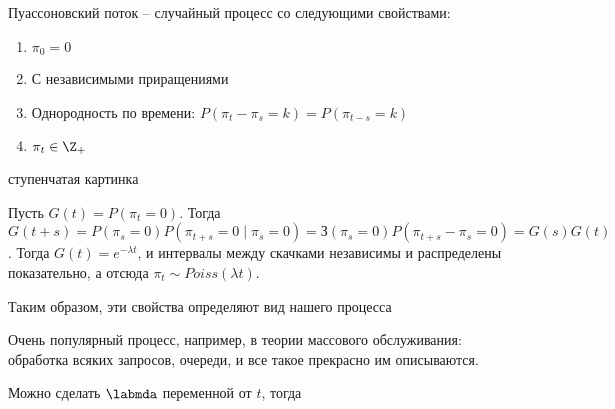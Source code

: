 \begin{Def}
Пуассоновский поток -- случайный процесс со следующими свойствами:
\begin{enumerate}
\item $\pi_0 = 0$
\item С независимыми приращениями
\item Однородность по времени: $P(\pi_t - \pi_s = k) = P(\pi_{t-s} = k)$
\item $\pi_t \in \Z_+$
\end{enumerate}
\end{Def}
\TODO ступенчатая картинка \TODO

Пусть $G(t) = P(\pi_t = 0)$. Тогда $G(t + s) = P(\pi_s = 0) P(\pi_{t + s} = 0 \mid \pi_s = 0) = З(\pi_s = 0) P(\pi_{t + s} - \pi_s = 0) = G(s) G(t)$.
Тогда $G(t) = e^{-\lambda t}$, и интервалы между скачками независимы и распределены показательно, а отсюда $\pi_t \sim Poiss(\lambda t)$.

Таким образом, эти свойства определяют вид нашего процесса

\begin{Rem}
Очень популярный процесс, например, в теории массового обслуживания: обработка всяких запросов, очереди, и все такое прекрасно им описываются.
\end{Rem}

Можно сделать $\labmda$ переменной от $t$, тогда \TODO \TODO

